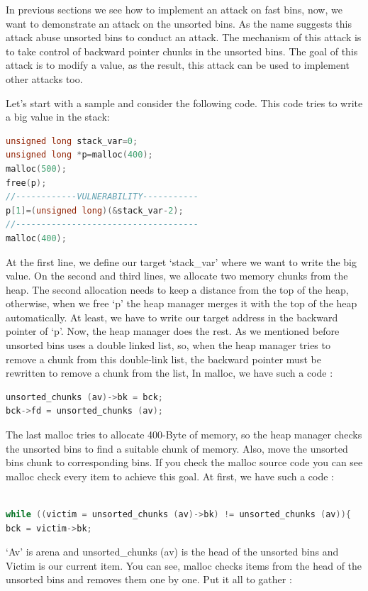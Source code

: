 \documentclass{masterthesis}
\newcommand*\fb{fast bins}
\newcommand*\ub{unsorted bins}
\begin{document}
In previous sections we see how to implement an attack on \fb{}, now, we want to demonstrate an attack on the \ub{}. As the name suggests this attack abuse \ub{} to conduct an attack. The mechanism of this attack is to take control of backward pointer chunks in the \ub{}. The goal of this attack is to modify a value, as the result, this attack can be used to implement other attacks too.

Let’s start with a sample and consider the following code. This code tries to write a big value in the stack:

\begin{lstlisting}[language=c,frame=tlrb]
unsigned long stack_var=0;
unsigned long *p=malloc(400);
malloc(500);
free(p);
//------------VULNERABILITY-----------
p[1]=(unsigned long)(&stack_var-2);
//------------------------------------
malloc(400);
\end{lstlisting}
 At the first line, we define our target ‘stack\_var’ where we want to write the big value. On the second and third lines, we allocate two memory chunks from the heap. The second allocation needs to keep a distance from the top of the heap, otherwise, when we free ‘p’ the heap manager merges it with the top of the heap automatically. At least, we have to write our target address in the backward pointer of ‘p’. Now, the heap manager does the rest. As we mentioned before \ub{} uses a double linked list, so, when the heap manager tries to remove a chunk from this double-link list, the backward pointer must be rewritten to remove a chunk from the list, In malloc, we have such a code : 
 
\begin{lstlisting}[language=c,frame=tlrb]
unsorted_chunks (av)->bk = bck;
bck->fd = unsorted_chunks (av);
\end{lstlisting}

The last malloc tries to allocate 400-Byte of memory, so the heap manager checks the \ub{} to find a suitable chunk of memory. Also, move the \ub{} chunk to corresponding bins. If you check the malloc source code you can see malloc check every item to achieve this goal. At first, we have such a code :
\begin{lstlisting}[language=c,frame=tlrb]

while ((victim = unsorted_chunks (av)->bk) != unsorted_chunks (av)){
bck = victim->bk;
\end{lstlisting}
‘Av’ is arena and unsorted\_chunks (av) is the head of the \ub{} and Victim is our current item. You can see, malloc checks items from the head of the \ub{} and removes them one by one. Put it all to gather :
\end{document}

